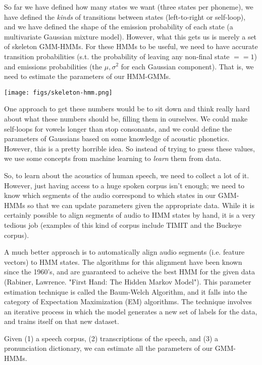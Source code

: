 \documentclass[10pt,a4paper]{article}
\begin{document}
So far we have defined how many states we want (three states per phoneme), we have defined the \textit{kinds} of transitions between states (left-to-right or self-loop), and we have defined the shape of the emission probability of each state (a multivariate Gaussian mixture model). However, what this gets us is merely a set of skeleton GMM-HMMs. For these HMMs to be useful, we need to have accurate transition probabilities (s.t. the probability of leaving any non-final state $== 1$) and emissions probabilities (the $\mu, \sigma^2$ for each Gaussian component). That is, we need to estimate the parameters of our HMM-GMMs.

\begin{center}
\texttt{[image: figs/skeleton-hmm.png]}
\end{center}

One approach to get these numbers would be to sit down and think really hard about what these numbers should be, filling them in ourselves. We could make self-loops for vowels longer than stop consonants, and we could define the parameters of Gaussians based on some knowledge of acoustic phonetics. However, this is a pretty horrible idea. So instead of trying to guess these values, we use some concepts from machine learning to \textit{learn} them from data.

So, to learn about the acoustics of human speech, we need to collect a lot of it. However, just having access to a huge spoken corpus isn't enough; we need to know which segments of the audio correspond to which states in our GMM-HMMs so that we can update parameters given the appropriate data. While it is certainly possible to align segments of audio to HMM states by hand, it is a very tedious job (examples of this kind of corpus include TIMIT and the Buckeye corpus).

A much better approach is to automatically align audio segments (i.e. feature vectors) to HMM states. The algorithms for this alignment have been known since the 1960's, and are guaranteed to acheive the best HMM for the given data (Rabiner, Lawrence. "First Hand: The Hidden Markov Model"). This parameter estimation technique is called the Baum-Welch Algorithm, and it falls into the category of Expectation Maximization (EM) algorithms. The technique involves an iterative process in which the model generates a new set of labels for the data, and trains itself on that new dataset.

Given (1) a speech corpus, (2) transcriptions of the speech, and (3) a pronunciation dictionary, we can estimate all the parameters of our GMM-HMMs.
\end{document}
